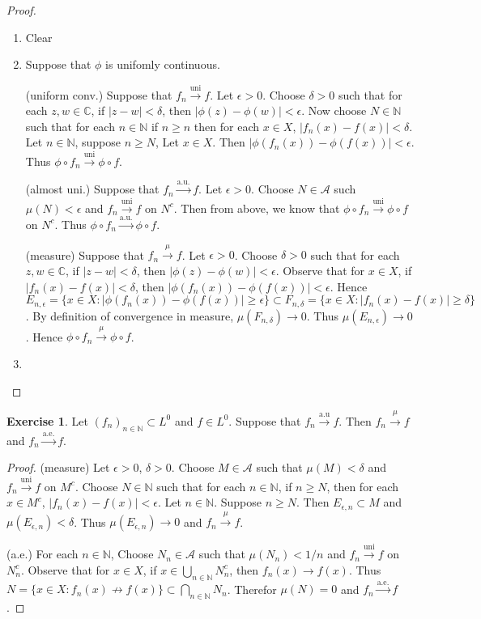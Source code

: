 \documentclass[12pt]{amsart}
\theoremstyle{definition}
\newtheorem{ex}[definition]{Exercise}
\newcommand{\del}{\delta}
\newcommand{\ep}{\epsilon}
\newcommand{\C}{\mathbb{C}}
\newcommand{\N}{\mathbb{N}}
\newcommand{\MA}{\mathcal{A}}
\newcommand{\convt}[1]{\xrightarrow{\text{#1}}}
\newcommand{\conv}[1]{\xrightarrow{#1}}
\begin{document}
	\begin{proof}
		\begin{enumerate}
			\item Clear
			\item Suppose that $\phi$ is unifomly continuous. 
			
			(uniform conv.) Suppose that $f_n \convt{uni} f$. Let $\ep > 0$. Choose $\del >0$ such that for each $z,w \in \C$, if $|z-w|<\del$, then $|\phi(z) - \phi(w)| < \ep$. Now choose $N \in \N$ such that for each $n \in \N$ if $n \geq n$ then for each $x \in X$, $|f_n(x)-f(x)| < \del$. Let $n \in \N$, suppose $n \geq N$, Let $x \in X$. Then $|\phi(f_n(x)) - \phi(f(x))| < \ep$. Thus $\phi \circ f_n \convt{uni} \phi \circ f$.
			
			(almost uni.) Suppose that $f_n \convt{a.u.} f$. Let $\ep > 0$. Choose $N \in \MA$ such $\mu(N) < \ep$ and $f_n \convt{uni} f$ on $N^c$. Then from above, we know that $\phi \circ f_n \convt{uni} \phi \circ f$ on $N^c$. Thus $\phi \circ f_n \convt{a.u.} \phi \circ f$.
			
			(measure) Suppose that $f_n \conv{\mu} f$. Let $\ep > 0$. Choose $\del >0$ such that for each $z,w \in \C$, if $|z-w|<\del$, then $|\phi(z) - \phi(w)| < \ep$. Observe that for $x \in X$, if $|f_n(x) - f(x)| < \del$, then $|\phi(f_n(x)) - \phi(f(x))| < \ep$. Hence $E_{n,\ep} = \{x \in X: |\phi(f_n(x)) - \phi(f(x))| \geq \ep\} \subset F_{n,\del} = \{x \in X: |f_n(x) - f(x)| \geq \del\}$. By definition of convergence in measure, $\mu(F_{n,\del}) \rightarrow 0$. Thus $\mu(E_{n,\ep}) \rightarrow 0$. Hence $\phi \circ f_n \conv{\mu} \phi \circ f$.
			
			\item
		\end{enumerate}
	\end{proof}
	
	\begin{ex}
		Let $(f_n)_{n \in \N} \subset L^0$ and $f \in L^0$. Suppose that $f_n \convt{a.u} f$. Then $f_n \conv{\mu}f$ and $f_n \convt{a.e.}f$. 
	\end{ex}
	
	\begin{proof}
		(measure) Let $\ep>0$, $\del >0$. Choose $M \in \MA$ such that $\mu(M) < \del$ and $f_n \convt{uni} f$ on $M^c$. Choose $N \in \N$ such that for each $n \in \N$, if $n \geq N$, then for each $x \in M^c$, $|f_n(x) - f(x)| < \ep$. Let $n \in \N$. Suppose $n \geq N$. Then $E_{\ep,n} \subset M$ and $\mu(E_{\ep,n}) < \del$. Thus $\mu(E_{\ep,n}) \rightarrow 0$ and $f_n \conv{\mu} f$.
		
		(a.e.) For each $n \in \N$, Choose $N_n \in \MA$ such that $\mu(N_n) < 1/n$ and $f_n \convt{uni} f$ on $N_n^c$. Observe that for $x \in X$, if $x \in \bigcup_{n \in \N}N_n^c$, then $f_n(x) \rightarrow f(x)$. Thus $N = \{x \in X: f_n(x) \not \rightarrow f(x)\} \subset \bigcap_{n \in \N} N_n$. Therefor $\mu(N) = 0$ and $f_n \convt{a.e.} f$.
	\end{proof}
	
\end{document}
